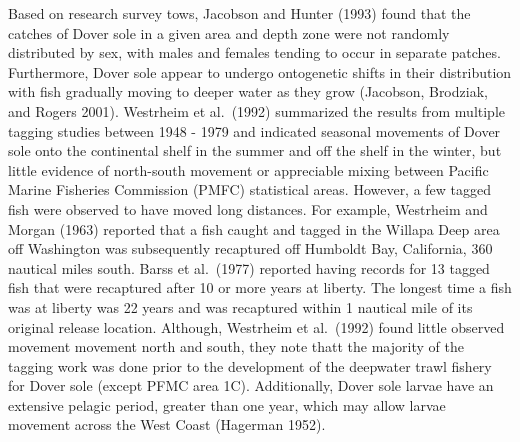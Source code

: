 \documentclass[11pt,
  english,
  a4paper,
]{article}
\begin{document}
\leavevmode\tagmcend\tagstructend\par


Based on research survey tows, Jacobson and Hunter {(1993)\leavevmode\tagmcend\tagstructend} found that the catches of Dover sole in a given area and depth zone were not randomly distributed by sex, with males and females tending to occur in separate patches. Furthermore, Dover sole appear to undergo ontogenetic shifts in their distribution with fish gradually moving to deeper water as they grow {(Jacobson, Brodziak, and Rogers 2001)\leavevmode\tagmcend\tagstructend}. Westrheim et al.~{(1992)\leavevmode\tagmcend\tagstructend} summarized the results from multiple tagging studies between 1948 - 1979 and indicated seasonal movements of Dover sole onto the continental shelf in the summer and off the shelf in the winter, but little evidence of north-south movement or appreciable mixing between Pacific Marine Fisheries Commission (PMFC) statistical areas. However, a few tagged fish were observed to have moved long distances. For example, Westrheim and Morgan {(1963)\leavevmode\tagmcend\tagstructend} reported that a fish caught and tagged in the Willapa Deep area off Washington was subsequently recaptured off Humboldt Bay, California, 360 nautical miles south. Barss et al.~{(1977)\leavevmode\tagmcend\tagstructend} reported having records for 13 tagged fish that were recaptured after 10 or more years at liberty. The longest time a fish was at liberty was 22 years and was recaptured within 1 nautical mile of its original release location. Although, Westrheim et al.~{(1992)\leavevmode\tagmcend\tagstructend} found little observed movement movement north and south, they note thatt the majority of the tagging work was done prior to the development of the deepwater trawl fishery for Dover sole (except PFMC area 1C). Additionally, Dover sole larvae have an extensive pelagic period, greater than one year, which may allow larvae movement across the West Coast {(Hagerman 1952)\leavevmode\tagmcend\tagstructend}.

\leavevmode\tagmcend\tagstructend\par
\end{document}
